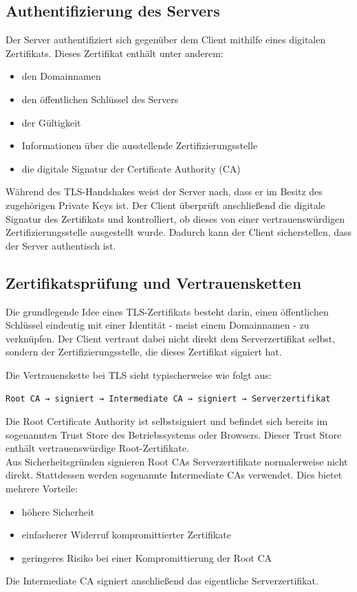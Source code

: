 \subsection*{Authentifizierung des Servers}
Der Server authentifiziert sich gegenüber dem Client mithilfe eines digitalen Zertifikats. Dieses Zertifikat enthält unter anderem:
\begin{itemize}
  \item den Domainnamen
  \item den öffentlichen Schlüssel des Servers
  \item der Gültigkeit
  \item Informationen über die ausstellende Zertifizierungsstelle
  \item die digitale Signatur der Certificate Authority (CA)
\end{itemize}
Während des TLS-Handshakes weist der Server nach, dass er im Besitz des zugehörigen Private Keys ist. Der Client überprüft anschließend die digitale Signatur des Zertifikats und kontrolliert, ob dieses von einer vertrauenswürdigen Zertifizierungsstelle ausgestellt wurde. Dadurch kann der Client sicherstellen, dass der Server authentisch ist.

\subsection*{Zertifikatsprüfung und Vertrauensketten}
Die grundlegende Idee eines TLS-Zertifikats besteht darin, einen öffentlichen Schlüssel eindeutig mit einer Identität - meist einem Domainnamen - zu verknüpfen. Der Client vertraut dabei nicht direkt dem Serverzertifikat selbst, sondern der Zertifizierungsstelle, die dieses Zertifikat signiert hat.

Die Vertrauenskette bei TLS sieht typischerweise wie folgt aus:
\begin{lstlisting}
Root CA → signiert → Intermediate CA → signiert → Serverzertifikat
\end{lstlisting}
Die Root Certificate Authority ist selbstsigniert und befindet sich bereits im sogenannten Trust Store des Betriebssystems oder Browsers. Dieser Trust Store enthält vertrauenswürdige Root-Zertifikate. \\
Aus Sicherheitsgründen signieren Root CAs Serverzertifikate normalerweise nicht direkt. Stattdessen werden sogenannte Intermediate CAs verwendet. Dies bietet mehrere Vorteile:
\begin{itemize}
  \item höhere Sicherheit
  \item einfacherer Widerruf kompromittierter Zertifikate
  \item geringeres Risiko bei einer Kompromittierung der Root CA
\end{itemize}
Die Intermediate CA signiert anschließend das eigentliche Serverzertifikat.

